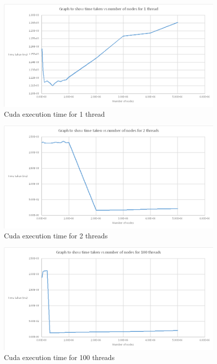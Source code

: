 \documentclass[a4paper]{report}
\begin{document}
\begin{figure}[H]
	\centering
	\includegraphics[width=1.3\textwidth]{images/cuda_1thread}
	\caption{Cuda execution time for 1 thread}
\end{figure}


\begin{figure}[H]
	\centering
	\includegraphics[width=1.3\textwidth]{images/cuda_2threads}
	\caption{Cuda execution time for 2 threads}
\end{figure}


\begin{figure}[H]
	\centering
	\includegraphics[width=1.3\textwidth]{images/cuda_100threads}
	\caption{Cuda execution time for 100 threads}
\end{figure}
\end{document}
